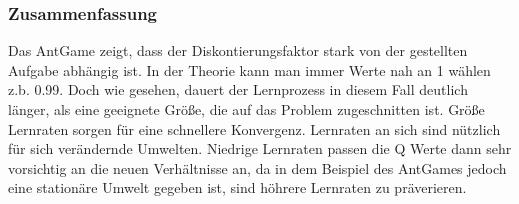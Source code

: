 \subsubsection{Zusammenfassung}
Das AntGame zeigt, dass der Diskontierungsfaktor stark von der gestellten Aufgabe abhängig ist. In der Theorie kann man immer Werte nah an 1 wählen z.b. 0.99. Doch wie gesehen, dauert der Lernprozess in diesem Fall deutlich länger, als eine geeignete Größe, die auf das Problem zugeschnitten ist. Größe Lernraten sorgen für eine schnellere Konvergenz. Lernraten an sich sind nützlich für sich verändernde Umwelten. Niedrige Lernraten passen die Q Werte dann sehr vorsichtig an die neuen Verhältnisse an, da in dem Beispiel des AntGames jedoch eine stationäre Umwelt gegeben ist, sind höhrere Lernraten zu präverieren.